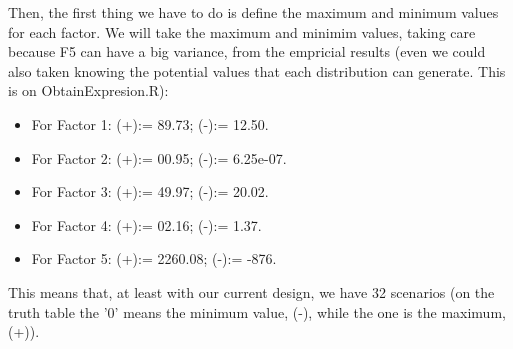 \documentclass[12pt]{article}
\begin{document}
\hfill%
\begin{minipage}{0.6\textwidth}\raggedright
 Then, the first thing we have to do is define the maximum and minimum values for each factor. We will take the maximum and minimim values, taking  care because F5 can have a big variance, from the empricial results (even we could also taken knowing the potential values that each distribution can generate. This is on ObtainExpresion.R):\\
\begin{itemize}
\item For Factor 1: (+):= 89.73; (-):= 12.50.
\item For Factor 2: (+):= 00.95; (-):= 6.25e-07.
\item For Factor 3: (+):= 49.97; (-):= 20.02.
\item For Factor 4: (+):= 02.16; (-):= 1.37.
\item For Factor 5: (+):= 2260.08; (-):= -876.
\end{itemize}
This means that, at least with our current design, we have 32 scenarios (on the truth table the '0' means the minimum value, (-), while the one is the maximum, (+)).
\end{minipage}
\end{document}
